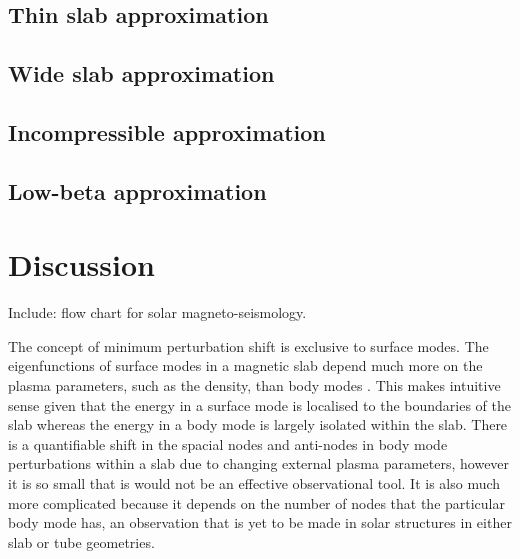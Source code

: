 \documentclass[namedreferences]{solarphysics}
\numberwithin{equation}{section}
\begin{document}
\begin{article}
\subsection{Thin slab approximation}


\subsection{Wide slab approximation}


\subsection{Incompressible approximation}


\subsection{Low-beta approximation}


\section{Discussion}
Include: flow chart for solar magneto-seismology.

The concept of minimum perturbation shift is exclusive to surface modes. The eigenfunctions of surface modes in a magnetic slab depend much more on the plasma parameters, such as the density, than body modes \citep{all_etal17}. This makes intuitive sense given that the energy in a surface mode is localised to the boundaries of the slab whereas the energy in a body mode is largely isolated within the slab. There is a quantifiable shift in the spacial nodes and anti-nodes in body mode perturbations within a slab due to changing external plasma parameters, however it is so small that is would not be an effective observational tool. It is also much more complicated because it depends on the number of nodes that the particular body mode has, an observation that is yet to be made in solar structures in either slab or tube geometries.






\end{article} 
\end{document}
